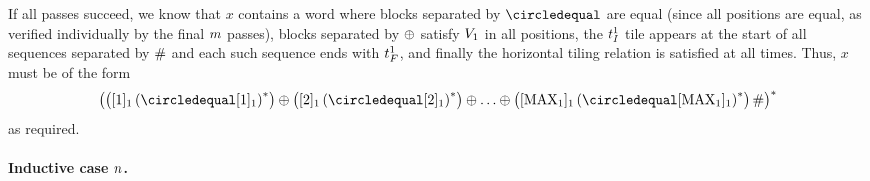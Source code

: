 If all passes succeed, we know that $x$ contains a word where blocks separated by $\numeq$ are equal
(since all positions are equal, as verified individually by the final $m$ passes),
blocks separated by $\oplus$ satisfy $V_{1}$ in all positions,
the $t_I^{1}$ tile appears at the start of all sequences separated by $\#$ and each such sequence ends with $t_F^{1}$, and
finally the horizontal tiling relation is satisfied at all times.
Thus, $x$ must be of the form
\[
    \brac{
        \brac{\tenc{1}{1} \brac{\numeq \tenc{1}{1}}^\ast}
        \numplus
        \brac{\tenc{1}{2} \brac{\numeq \tenc{1}{2}}^\ast}
        \numplus
        \ldots
        \numplus
        \brac{
            \tenc{1}{\nmax{1}}
                \brac{\numeq \tenc{1}{\nmax{1}}}^\ast
        }
        \numsep
    }^\ast
\]
as required.


\paragraph{Inductive case $n$.}

